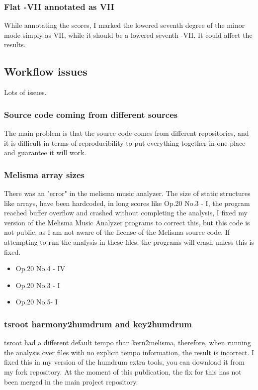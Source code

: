 		\subsubsection{Flat -VII annotated as VII}
    While annotating the scores, I marked the lowered seventh degree of the minor mode simply as VII, while it should be a lowered seventh -VII. It could affect the results.
	\subsection{Workflow issues}
    Lots of issues.
		\subsubsection{Source code coming from different sources}
    The main problem is that the source code comes from different repositories, and it is difficult in terms of reproducibility to put everything together in one place and guarantee it will work.
		\subsubsection{Melisma array sizes}
    There was an "error" in the melisma music analyzer. The size of static structures like arrays, have been hardcoded, in long scores like Op.20 No.3 - I, the program reached buffer overflow and crashed without completing the analysis, I fixed my version of the Melisma Music Analyzer programs to correct this, but this code is not public, as I am not aware of the license of the Melisma source code. If attempting to run the analysis in these files, the programs will crash unless this is fixed.
    \begin{itemize}
    \item Op.20 No.4 - IV
    \item Op.20 No.3 - I
    \item Op.20 No.5- I
    \end{itemize}
		\subsubsection{tsroot harmony2humdrum and key2humdrum}
    tsroot had a different default tempo than kern2melisma, therefore, when running the analysis over files with no explicit tempo information, the result is incorrect. I fixed this in my version of the humdrum extra tools, you can download it from my fork repository. At the moment of this publication, the fix for this has not been merged in the main project repository.

